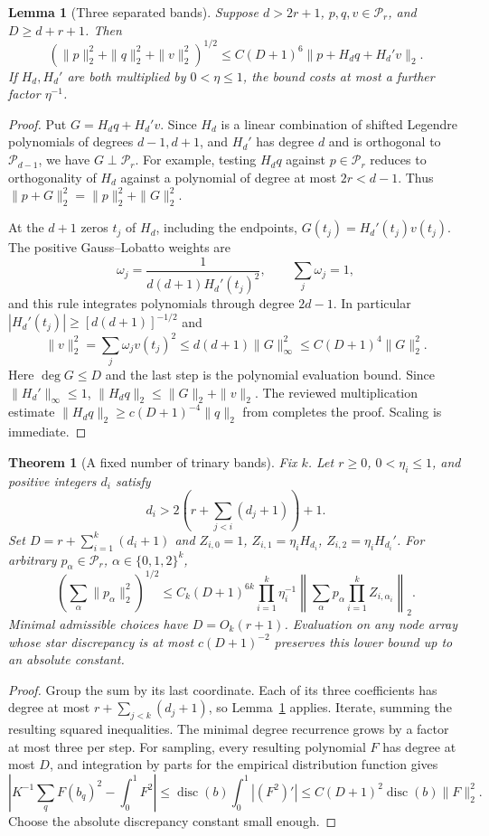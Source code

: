 \documentclass[11pt]{article}
\newtheorem{theorem}{Theorem}
\newtheorem{lemma}{Lemma}
\newcommand{\PP}{\mathcal P}
\begin{document}
\begin{lemma}[Three separated bands]\label{three}
Suppose $d>2r+1$, $p,q,v\in\PP_r$, and $D\ge d+r+1$. Then
\[
 (\|p\|_2^2+\|q\|_2^2+\|v\|_2^2)^{1/2}
 \le C(D+1)^6\|p+H_dq+H_d'v\|_2.
\]
If $H_d,H_d'$ are both multiplied by $0<\eta\le1$, the bound
costs at most a further factor $\eta^{-1}$.
\end{lemma}
\begin{proof}
Put $G=H_dq+H_d'v$. Since $H_d$ is a linear combination of
shifted Legendre polynomials of degrees $d-1,d+1$, and $H_d'$ has
degree $d$ and is orthogonal to $\PP_{d-1}$, we have
$G\perp\PP_r$. For example, testing $H_dq$ against $p\in\PP_r$
reduces to orthogonality of $H_d$ against a polynomial of degree
at most $2r<d-1$. Thus $\|p+G\|_2^2=\|p\|_2^2+\|G\|_2^2$.

At the $d+1$ zeros $t_j$ of $H_d$, including the endpoints,
$G(t_j)=H_d'(t_j)v(t_j)$. The positive Gauss--Lobatto weights are
\[
 \omega_j=\frac1{d(d+1)H_d'(t_j)^2},\qquad \sum_j\omega_j=1,
\]
and this rule integrates polynomials through degree $2d-1$.
In particular $|H_d'(t_j)|\ge[d(d+1)]^{-1/2}$ and
\[
 \|v\|_2^2=\sum_j\omega_jv(t_j)^2
 \le d(d+1)\|G\|_\infty^2
 \le C(D+1)^4\|G\|_2^2.
\]
Here $\deg G\le D$ and the last step is the polynomial evaluation bound.
Since $\|H_d'\|_\infty\le1$,
$\|H_dq\|_2\le\|G\|_2+\|v\|_2$.
The reviewed multiplication estimate
$\|H_dq\|_2\ge c(D+1)^{-4}\|q\|_2$ from
completes the proof. Scaling is immediate.
\end{proof}

\begin{theorem}[A fixed number of trinary bands]\label{many}
Fix $k$. Let $r\ge0$, $0<\eta_i\le1$, and positive integers $d_i$
satisfy
\[
 d_i>2\left(r+\sum_{j<i}(d_j+1)\right)+1.
\]
Set $D=r+\sum_{i=1}^k(d_i+1)$ and
$Z_{i,0}=1$, $Z_{i,1}=\eta_iH_{d_i}$, $Z_{i,2}=\eta_iH_{d_i}'$.
For arbitrary $p_\alpha\in\PP_r$, $\alpha\in\{0,1,2\}^k$,
\[
 \left(\sum_\alpha\|p_\alpha\|_2^2\right)^{1/2}
 \le C_k(D+1)^{6k}\prod_{i=1}^k\eta_i^{-1}
 \left\|\sum_\alpha p_\alpha\prod_{i=1}^kZ_{i,\alpha_i}\right\|_2.
\]
Minimal admissible choices have $D=O_k(r+1)$. Evaluation on any
node array whose star discrepancy is at most $c(D+1)^{-2}$ preserves
this lower bound up to an absolute constant.
\end{theorem}
\begin{proof}
Group the sum by its last coordinate. Each of its three coefficients
has degree at most $r+\sum_{j<k}(d_j+1)$, so Lemma~\ref{three}
applies. Iterate, summing the resulting squared inequalities. The
minimal degree recurrence grows by a factor at most three per step.
For sampling, every resulting polynomial $F$ has degree at most $D$,
and integration by parts for the empirical distribution function gives
\[
 \left|K^{-1}\sum_qF(b_q)^2-\int_0^1F^2\right|
 \le\operatorname{disc}(b)\int_0^1|(F^2)'|
 \le C(D+1)^2\operatorname{disc}(b)\|F\|_2^2.
\]
Choose the absolute discrepancy constant small enough.
\end{proof}
\end{document}
